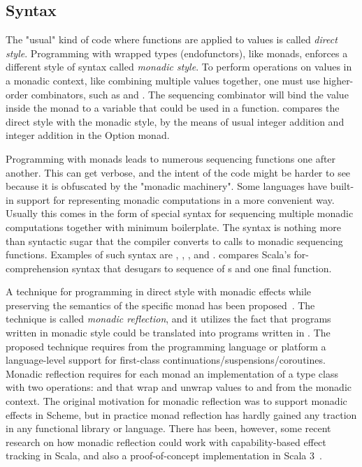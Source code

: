 \subsection{Syntax} \label{monads:syntax}
The "usual" kind of code where functions are applied to values is called \emph{direct style}. Programming with wrapped types (endofunctors), like monads, enforces a different style of syntax called \emph{monadic style}. To perform operations on values in a monadic context, like combining multiple values together, one must use higher-order combinators, such as  and . The sequencing combinator will bind the value inside the monad to a variable that could be used in a function.  compares the direct style with the monadic style, by the means of usual integer addition and integer addition in the Option monad.



Programming with monads leads to numerous sequencing functions one after another. This can get verbose, and the intent of the code might be harder to see because it is obfuscated by the "monadic machinery". Some languages have built-in support for representing monadic computations in a more convenient way. Usually this comes in the form of special syntax for sequencing multiple monadic computations together with minimum boilerplate. The syntax is nothing more than syntactic sugar that the compiler converts to calls to monadic sequencing functions. Examples of such syntax are \textcite{haskell-do-notation}, \textcite{scala-for-comprehension}, \textcite{fsharp-computation-expression}, and \textcite{ocaml-bind-ops}.  compares Scala's for-comprehension syntax that desugars to sequence of s and one final  function.



A technique for programming in direct style with monadic effects while preserving the semantics of the specific monad has been proposed~\cite{representing-monads}. The technique is called \emph{monadic reflection}, and it utilizes the fact that programs written in monadic style could be translated into programs written in . The proposed technique requires from the programming language or platform a language-level support for first-class continuations/suspensions/coroutines. Monadic reflection requires for each monad an implementation of a type class with two operations:  and  that wrap and unwrap values to and from the monadic context. The original motivation for monadic reflection was to support monadic effects in Scheme, but in practice monad reflection has hardly gained any traction in any functional library or language. There has been, however, some recent research on how monadic reflection could work with capability-based effect tracking in Scala, and also a proof-of-concept implementation in Scala 3~\cite{representing-monads-capabilities, monadic-reflection-scala}.


